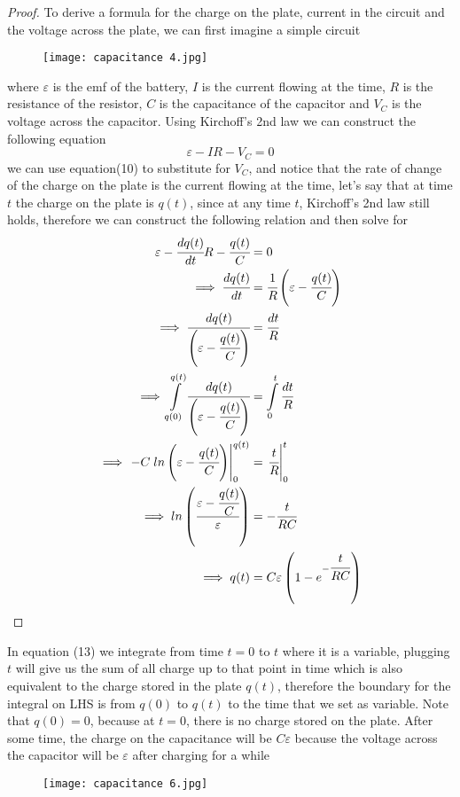 \documentclass{article}
\begin{document}
\begin{proof}
To derive a formula for the charge on the plate, current in the circuit and the voltage across the plate, we can first imagine a simple circuit
\begin{figure}[H]
    \centering
    \texttt{[image: capacitance 4.jpg]}
\end{figure}
where $\varepsilon$ is the emf of the battery, $I$ is the current flowing at the time, $R$ is the resistance of the resistor, $C$ is the capacitance of the capacitor and $V_C$ is the voltage across the capacitor. Using Kirchoff's 2nd law we can construct the following equation
$$\varepsilon - IR-V_C=0$$
we can use equation(10) to substitute for $V_C$, and notice that the rate of change of the charge on the plate is the current flowing at the time, let's say that at time $t$ the charge on the plate is $q(t)$, since at any time $t$, Kirchoff's 2nd law still holds, therefore we can construct the following relation and then solve for 
\begingroup
\allowdisplaybreaks
\begin{align}
    \varepsilon-\cfrac{dq(t)}{dt}R-\cfrac{q(t)}{C}&=0 \nonumber \\ 
    \implies \cfrac{dq(t)}{dt} &=\cfrac{1}{R}\left(\varepsilon-\cfrac{q(t)}{C}\right) \nonumber \\ 
    \implies \cfrac{dq(t)}{\left(\varepsilon-\cfrac{q(t)}{C}\right)}&=\cfrac{dt}{R} \nonumber \\ 
    \implies \int \limits_{q(0)}^{q(t)}  \cfrac{dq(t)}{\left(\varepsilon-\cfrac{q(t)}{C}\right)} &=\int  \limits_0^t\cfrac{dt}{R} \\
    \implies \left.-C\;ln \left(\varepsilon-\cfrac{q(t)}{C}\right)\right|_0^{q(t)} &= \left.\cfrac{t}{R} \right|_0^t\nonumber \\ \implies ln\left(\cfrac{\varepsilon-\cfrac{q(t)}{C}}{\varepsilon}\right)&=-\cfrac{t}{RC} \nonumber \\ \implies q(t)&= C\varepsilon\left(1- e^{-\cfrac{t}{RC}}\right) \nonumber
\end{align}
\endgroup
\end{proof}
In equation (13) we integrate from time $t=0$ to $t$ where it is a variable, plugging $t$ will give us the sum of all charge up to that point in time which is also equivalent to the charge stored in the plate $q(t)$, therefore the boundary for the integral on LHS is from $q(0)$ to $q(t)$ to the time that we set as variable. Note that $q(0)=0$, because at $t=0$, there is no charge stored on the plate. After some time, the charge on the capacitance will be $C\varepsilon$ because the voltage across the capacitor will be $\varepsilon$ after charging for a while
\begin{figure}[H]
    \centering
    \texttt{[image: capacitance 6.jpg]}
\end{figure}
\end{document}
